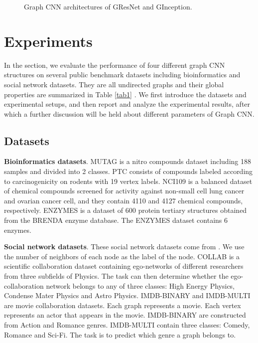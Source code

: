 \documentclass[journal]{IEEEtran}
\begin{document}
\begin{figure}[t]
	\centering
	\vspace{-1em}
	\caption{Graph CNN architectures of G\underline{\hspace{0.5em}}ResNet and G\underline{\hspace{0.5em}}Inception.}
	\label{sturcture2}
\end{figure}


\section{Experiments}
\label{sec:exp}
In the section, we evaluate the performance of four different graph CNN structures on several public benchmark datasets including bioinformatics and social network datasets. They are all undirected graphs and their global properties are summarized in Table \ref{tab1}  \cite{DyGraph2017}. We first introduce the datasets and experimental setups, and then report and analyze the experimental results, after which a further discussion will be held about different parameters of Graph CNN.


\subsection{Datasets}
\textbf{Bioinformatics datasets}.
MUTAG \cite{mutag} is a nitro compounds dataset including 188 samples and divided into 2 classes.
PTC \cite{ptc} consists of compounds labeled according to carcinogenicity on rodents with 19 vertex labels.
NCI109 \cite{nci1andnci109} is a balanced dataset of chemical compounds screened for activity against non-small cell lung cancer and ovarian cancer cell, and they contain 4110 and 4127 chemical compounds, respectively.
ENZYMES \cite{enzymes} is a dataset of 600 protein tertiary structures obtained from the BRENDA enzyme database. The ENZYMES dataset contains 6 enzymes.


\textbf{Social network datasets}. These social network datasets come from \cite{deepgraphkerner}. We use the number of neighbors of each node as the label of the node.
COLLAB is a scientific collaboration dataset containing ego-networks of different researchers from three subfields of Physics. The task can then determine whether the ego-collaboration network belongs to any of three classes: High Energy Physics, Condense Mater Physics and Astro Physics.
IMDB-BINARY and IMDB-MULTI are movie collaboration datasets. Each graph represents a movie. Each vertex represents an actor that appears in the movie. IMDB-BINARY are constructed from Action and Romance genres. IMDB-MULTI contain three classes: Comedy, Romance and Sci-Fi. The task is to predict which genre a graph belongs to.
\end{document}
